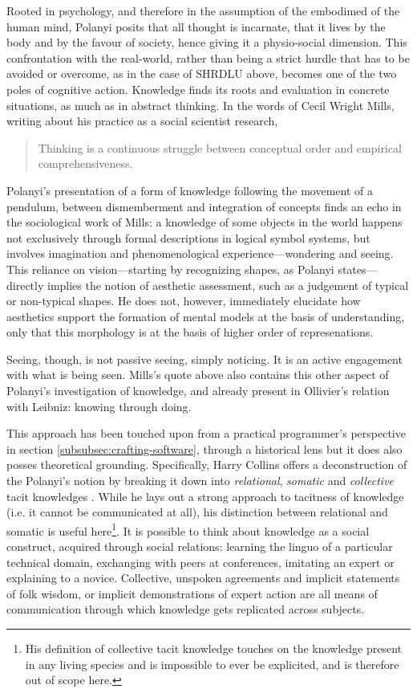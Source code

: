 Rooted in psychology, and therefore in the assumption of the embodimed of the human mind, Polanyi posits that all thought is incarnate, that it lives by the body and by the favour of society, hence giving it a physio-social dimension. This confrontation with the real-world, rather than being a strict hurdle that has to be avoided or overcome, as in the case of SHRDLU above, becomes one of the two poles of cognitive action. Knowledge finds its roots and evaluation in concrete situations, as much as in abstract thinking. In the words of Cecil Wright Mills, writing about his practice as a social scientist research,

\begin{quote}
    Thinking is a continuous struggle between conceptual order and empirical comprehensiveness. \citep{MillsC.WrightCharlesWright2000Tsi}
\end{quote}

Polanyi's presentation of a form of knowledge following the movement of a pendulum, between dismemberment and integration of concepts finds an echo in the sociological work of Mills: a knowledge of some objects in the world happens not exclusively through formal descriptions in logical symbol systems, but involves imagination and phenomenological experience—wondering and seeing. This reliance on vision—starting by recognizing shapes, as Polanyi states—directly implies the notion of aesthetic assessment, such as a judgement of typical or non-typical shapes. He does not, however, immediately elucidate how aesthetics support the formation of mental models at the basis of understanding, only that this morphology is at the basis of higher order of represenations.

Seeing, though, is not passive seeing, simply noticing. It is an active engagement with what is being seen. Mills's quote above also contains this other aspect of Polanyi's investigation of knowledge, and already present in Ollivier's relation with Leibniz: knowing through doing.

This approach has been touched upon from a practical programmer's perspective in section \ref{subsubsec:crafting-software}, through a historical lens but it does also posses theoretical grounding. Specifically, Harry Collins offers a deconstruction of the Polanyi's notion by breaking it down into \emph{relational}, \emph{somatic} and \emph{collective} tacit knowledges \citep{collins_tacit_2010}. While he lays out a strong approach to tacitness of knowledge (i.e. it cannot be communicated at all), his distinction between relational and somatic is useful here\footnote{His definition of collective tacit knowledge touches on the knowledge present in any living species and is impossible to ever be explicited, and is therefore out of scope here.}. It is possible to think about knowledge as a social construct, acquired through social relations: learning the linguo of a particular technical domain, exchanging with peers at conferences, imitating an expert or explaining to a novice. Collective, unspoken agreements and implicit statements of folk wisdom, or implicit demonstrations of expert action are all means of communication through which knowledge gets replicated across subjects.

